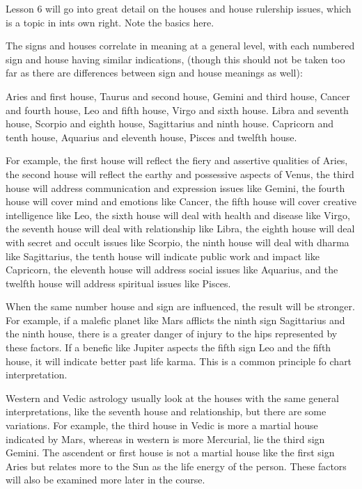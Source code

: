 Lesson 6 will go into great detail on the houses and house rulership issues, which is a topic in ints own right. Note the basics here.

 

The signs and houses correlate in meaning at a general level, with each numbered sign and house having similar indications, (though this should not be taken too far as there are differences between sign and house meanings as well):

 

Aries and first house, Taurus and second house, Gemini and third house,
Cancer and fourth house, Leo and fifth house, Virgo and sixth house.
Libra and seventh house, Scorpio and eighth house, Sagittarius and ninth house.
Capricorn and tenth house, Aquarius and eleventh house, Pisces and twelfth house.
 

For example, the first house will reflect the fiery and assertive qualities of Aries, the second house will reflect the earthy and possessive aspects of Venus, the third house will address communication and expression issues like Gemini, the fourth house will cover mind and emotions like Cancer, the fifth house will cover creative intelligence like Leo, the sixth house will deal with health and disease like Virgo, the seventh house will deal with relationship like Libra, the eighth house will deal with secret and occult issues like Scorpio, the ninth house will deal with dharma like Sagittarius, the tenth house will indicate public work and impact like Capricorn, the eleventh house will address social issues like Aquarius, and the twelfth house will address spiritual issues like Pisces.

 

When the same number house and sign are influenced, the result will be stronger. For example, if a malefic planet like Mars afflicts the ninth sign Sagittarius and the ninth house, there is a greater danger of injury to the hips represented by these factors. If a benefic like Jupiter aspects the fifth sign Leo and the fifth house, it will indicate better past life karma. This is a common principle fo chart interpretation.

 

Western and Vedic astrology usually look at the houses with the same general interpretations, like the seventh house and relationship, but there are some variations. For example, the third house in Vedic is more a martial house indicated by Mars, whereas in western is more Mercurial, lie the third sign Gemini. The ascendent or first house is not a martial house like the first sign Aries but relates more to the Sun as the life energy of the person. These factors will also be examined more later in the course.

